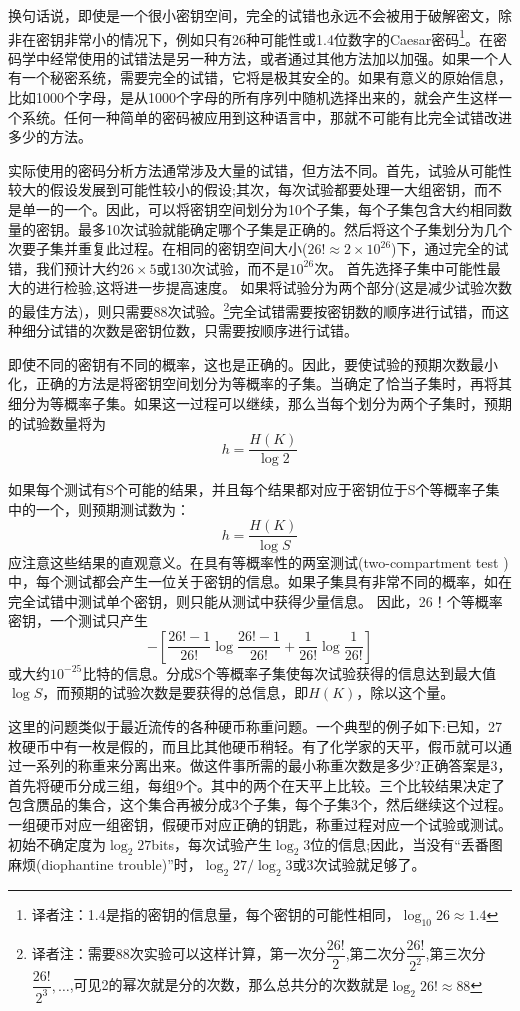 \documentclass[]{article}
\begin{document}
换句话说，即使是一个很小密钥空间，完全的试错也永远不会被用于破解密文，除非在密钥非常小的情况下，例如只有26种可能性或1.4位数字的Caesar密码\footnote{译者注：1.4是指的密钥的信息量，每个密钥的可能性相同，$\log_{10}{26}\approx 1.4$}。在密码学中经常使用的试错法是另一种方法，或者通过其他方法加以加强。如果一个人有一个秘密系统，需要完全的试错，它将是极其安全的。如果有意义的原始信息，比如1000个字母，是从1000个字母的所有序列中随机选择出来的，就会产生这样一个系统。任何一种简单的密码被应用到这种语言中，那就不可能有比完全试错改进多少的方法。

实际使用的密码分析方法通常涉及大量的试错，但方法不同。首先，试验从可能性较大的假设发展到可能性较小的假设;其次，每次试验都要处理一大组密钥，而不是单一的一个。因此，可以将密钥空间划分为10个子集，每个子集包含大约相同数量的密钥。最多10次试验就能确定哪个子集是正确的。然后将这个子集划分为几个次要子集并重复此过程。在相同的密钥空间大小($26!\approx 2\times 10^{26}$)下，通过完全的试错，我们预计大约$26\times 5$或130次试验，而不是$10^{26}$次。
首先选择子集中可能性最大的进行检验,这将进一步提高速度。
如果将试验分为两个部分(这是减少试验次数的最佳方法)，则只需要88次试验。\footnote{译者注：需要88次实验可以这样计算，第一次分$\dfrac{26!}{2}$,第二次分$\dfrac{26!}{2^2}$,第三次分$\dfrac{26!}{2^3},\ldots$,可见2的幂次就是分的次数，那么总共分的次数就是$\log_2{26!}\approx 88$}完全试错需要按密钥数的顺序进行试错，而这种细分试错的次数是密钥位数，只需要按顺序进行试错。

即使不同的密钥有不同的概率，这也是正确的。因此，要使试验的预期次数最小化，正确的方法是将密钥空间划分为等概率的子集。当确定了恰当子集时，再将其细分为等概率子集。如果这一过程可以继续，那么当每个划分为两个子集时，预期的试验数量将为
\[h=\dfrac{H(K)}{\log{2}}\]

如果每个测试有S个可能的结果，并且每个结果都对应于密钥位于S个等概率子集中的一个，则预期测试数为：
\[h=\dfrac{H(K)}{\log{S}}\]
应注意这些结果的直观意义。在具有等概率性的两室测试(two-compartment test )中，每个测试都会产生一位关于密钥的信息。如果子集具有非常不同的概率，如在完全试错中测试单个密钥，则只能从测试中获得少量信息。
因此，26！个等概率密钥，一个测试只产生
\[-\left[\dfrac{26!-1}{26!} \log{\dfrac{26!-1}{26!}}+\dfrac{1}{26!}\log{\dfrac{1}{26!}}\right]\]
或大约$10^{-25}$比特的信息。分成S个等概率子集使每次试验获得的信息达到最大值$\log{S}$，而预期的试验次数是要获得的总信息，即$H(K)$，除以这个量。

这里的问题类似于最近流传的各种硬币称重问题。一个典型的例子如下:已知，27枚硬币中有一枚是假的，而且比其他硬币稍轻。有了化学家的天平，假币就可以通过一系列的称重来分离出来。做这件事所需的最小称重次数是多少?正确答案是3，首先将硬币分成三组，每组9个。其中的两个在天平上比较。三个比较结果决定了包含赝品的集合，这个集合再被分成3个子集，每个子集3个，然后继续这个过程。一组硬币对应一组密钥，假硬币对应正确的钥匙，称重过程对应一个试验或测试。初始不确定度为$\log_2{27}$bits，每次试验产生$\log_2{3}$位的信息;因此，当没有“丢番图麻烦(diophantine trouble)”时，$\log_2{27}/\log_2{3}$或3次试验就足够了。
\end{document}
